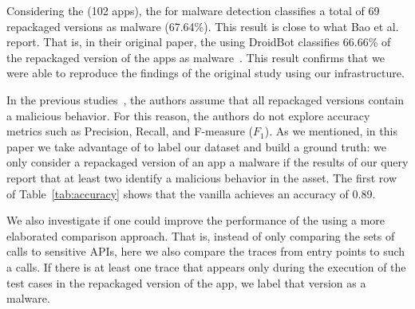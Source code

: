 Considering the \sds (102 apps), the \mas for malware detection 
classifies a total of 69 repackaged versions as malware (67.64\%).
This result is close to what Bao et al. report. That is, in their
original paper,  the \mas using DroidBot classifies 66.66\% of the
repackaged version of the apps as malware~\cite{DBLP:conf/wcre/BaoLL18}.
This result confirms that we were able to reproduce
the findings of the original study using our
infrastructure. 


In the previous studies~\cite{DBLP:conf/wcre/BaoLL18,DBLP:journals/jss/CostaMMSSBNR22},
the authors assume that all repackaged versions contain a
malicious behavior. For this reason, the authors do not
explore accuracy metrics such as Precision, Recall, and
F-measure ($F_1$). As we mentioned, in this paper we take advantage
of \vt to label our dataset and build a ground truth: we only
consider a repackaged version of an app a malware if the results
of our \vt query report that at least two
\ses identify a malicious behavior in the asset.
The first row of Table~\ref{tab:accuracy} shows that the
vanilla \mas achieves an accuracy of 0.89. 

\begin{table}[htb]
  \caption{Accuracy of the \mas in both datasets.}
  \label{tab:accuracy}
\end{table}

We also investigate if one could improve the performance of
the \mas using a more elaborated comparison approach.
That is, instead of only comparing the sets of calls to sensitive APIs,
here we also compare the traces from entry points to such a calls. If there is
at least one trace that appears only during the execution of the
test cases in the repackaged version of the app, we
label that version as a malware.

